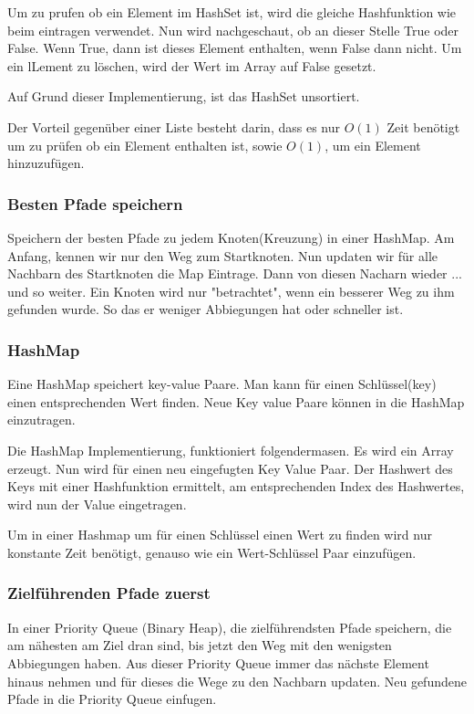 \documentclass[a4paper,12pt,arial]{scrartcl}
\begin{document}
Um zu prufen ob ein Element im HashSet ist, wird die gleiche Hashfunktion wie beim eintragen verwendet. Nun wird nachgeschaut, ob an dieser Stelle True oder False. Wenn True, dann ist dieses Element enthalten, wenn False dann nicht. Um ein lLement zu löschen, wird der Wert im Array auf False gesetzt.

Auf Grund dieser Implementierung, ist das HashSet unsortiert.

Der Vorteil gegenüber einer Liste besteht darin, dass es nur $O(1)$ Zeit benötigt um zu prüfen ob ein Element enthalten ist, sowie $O(1)$, um ein Element hinzuzufügen.

\subsubsection{Besten Pfade speichern}
Speichern der besten Pfade zu jedem Knoten(Kreuzung) in einer HashMap.
Am Anfang, kennen wir nur den Weg zum Startknoten.
Nun updaten wir für alle Nachbarn des Startknoten die Map Eintrage. Dann von diesen Nacharn wieder ... und so weiter.
Ein Knoten wird nur "betrachtet", wenn ein besserer Weg zu ihm gefunden wurde. So das er weniger Abbiegungen hat oder schneller ist.
\subsubsection{HashMap}
Eine HashMap speichert key-value Paare.
Man kann für einen Schlüssel(key) einen entsprechenden Wert finden.
Neue Key value Paare können in die HashMap einzutragen.

Die HashMap Implementierung, funktioniert folgendermasen. Es wird ein Array erzeugt.
Nun wird für einen neu eingefugten Key Value Paar. Der Hashwert des Keys mit einer Hashfunktion ermittelt, am entsprechenden Index des Hashwertes, wird nun der Value eingetragen.

Um in einer Hashmap um für einen Schlüssel einen Wert zu finden wird nur konstante Zeit benötigt, genauso wie ein Wert-Schlüssel Paar einzufügen.


\subsubsection{Zielführenden Pfade zuerst}
In einer Priority Queue (Binary Heap), die zielführendsten Pfade speichern, die am nähesten am Ziel dran sind, bis jetzt den Weg mit den wenigsten Abbiegungen haben.
Aus dieser Priority Queue immer das nächste Element hinaus nehmen und für dieses die Wege zu den Nachbarn updaten. Neu gefundene Pfade in die Priority Queue einfugen.
\end{document}
